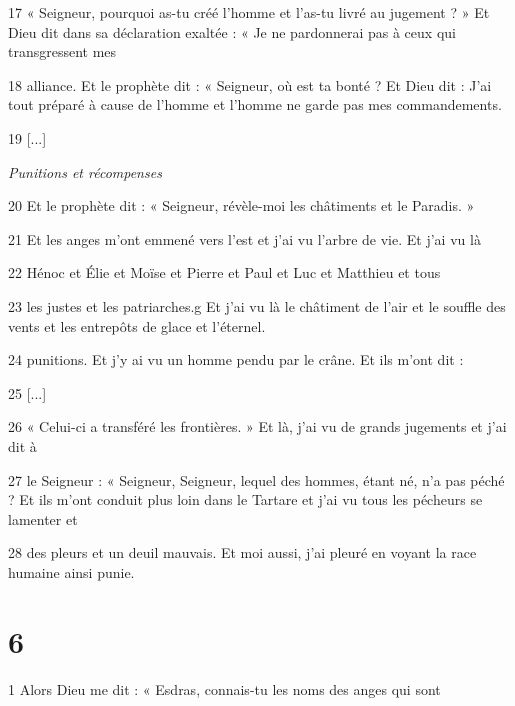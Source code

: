 \par 17 « Seigneur, pourquoi as-tu créé l'homme et l'as-tu livré au jugement ? » Et Dieu dit dans sa déclaration exaltée : « Je ne pardonnerai pas à ceux qui transgressent mes

\par 18 alliance. Et le prophète dit : « Seigneur, où est ta bonté ? Et Dieu dit : J'ai tout préparé à cause de l'homme et l'homme ne garde pas mes commandements.

\par 19 [...]

\par \textit{Punitions et récompenses}

\par 20 Et le prophète dit : « Seigneur, révèle-moi les châtiments et le Paradis. »

\par 21 Et les anges m'ont emmené vers l'est et j'ai vu l'arbre de vie. Et j'ai vu là

\par 22 Hénoc et Élie et Moïse et Pierre et Paul et Luc et Matthieu et tous

\par 23 les justes et les patriarches.g Et j'ai vu là le châtiment de l'air et le souffle des vents et les entrepôts de glace et l'éternel.

\par 24 punitions. Et j'y ai vu un homme pendu par le crâne. Et ils m'ont dit :

\par 25 [...]

\par 26 « Celui-ci a transféré les frontières. » Et là, j'ai vu de grands jugements et j'ai dit à

\par 27 le Seigneur : « Seigneur, Seigneur, lequel des hommes, étant né, n'a pas péché ? Et ils m'ont conduit plus loin dans le Tartare et j'ai vu tous les pécheurs se lamenter et

\par 28 des pleurs et un deuil mauvais. Et moi aussi, j'ai pleuré en voyant la race humaine ainsi punie.

\chapter{6}

\par 1 Alors Dieu me dit : « Esdras, connais-tu les noms des anges qui sont

